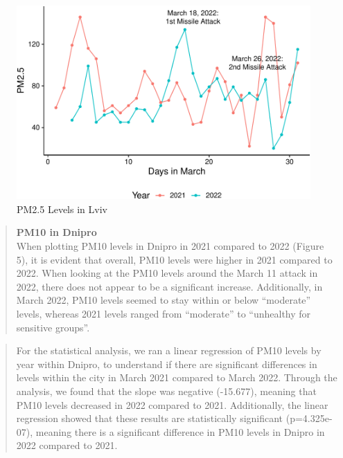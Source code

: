\documentclass[
  12pt,
]{article}
\begin{document}
\begin{figure}
\centering
\includegraphics{Fontanie_Gordon_Weinberg_Project_files/figure-latex/visualizing PM25 in Lviv-1.pdf}
\caption{PM2.5 Levels in Lviv}
\end{figure}

\newpage

\begin{quote}
\textbf{PM10 in Dnipro}\\
When plotting PM10 levels in Dnipro in 2021 compared to 2022 (Figure 5),
it is evident that overall, PM10 levels were higher in 2021 compared to
2022. When looking at the PM10 levels around the March 11 attack in
2022, there does not appear to be a significant increase. Additionally,
in March 2022, PM10 levels seemed to stay within or below ``moderate''
levels, whereas 2021 levels ranged from ``moderate'' to ``unhealthy for
sensitive groups''.
\end{quote}

\begin{quote}
For the statistical analysis, we ran a linear regression of PM10 levels
by year within Dnipro, to understand if there are significant
differences in levels within the city in March 2021 compared to March
2022. Through the analysis, we found that the slope was negative
(-15.677), meaning that PM10 levels decreased in 2022 compared to 2021.
Additionally, the linear regression showed that these results are
statistically significant (p=4.325e-07), meaning there is a significant
difference in PM10 levels in Dnipro in 2022 compared to 2021.
\end{quote}
\end{document}
